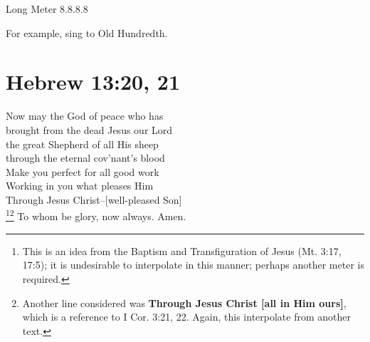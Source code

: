 \documentclass{article}
\begin{document}
\noindent Long Meter 8.8.8.8

\noindent For example, sing to Old Hundredth.

\section*{Hebrew 13:20, 21}

 Now may the God of peace who has\\
brought from the dead Jesus our Lord\\
the great Shepherd of all His sheep\\
through the eternal cov'nant's blood\\

 Make you perfect for all good work\\
Working in you what pleases Him\\
Through Jesus Christ--[well-pleased Son]\\\footnote{This is an idea from the Baptism and Transfiguration of Jesus (Mt. 3:17, 17:5); it is undesirable to interpolate in this manner; perhaps another meter is required.}\footnote{Another line considered was \textbf{Through Jesus Christ [all in Him ours]}, which is a reference to I Cor. 3:21, 22. Again, this interpolate from another text.}
To whom be glory, now always. Amen.
\end{document}
